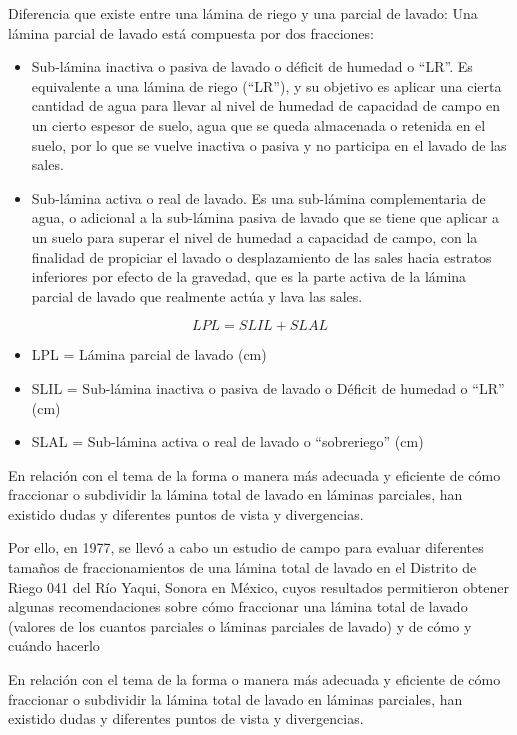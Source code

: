 Diferencia que existe entre una lámina de riego y una parcial de lavado: Una lámina parcial de lavado está compuesta por dos fracciones:
\begin{itemize}
    \item Sub-lámina inactiva o pasiva de lavado o déficit de humedad o “LR”. Es equivalente a una lámina de riego (“LR”), y su objetivo es aplicar una cierta cantidad de agua para llevar al nivel de humedad de capacidad de campo en un cierto espesor de suelo, agua que se queda almacenada o retenida en el suelo, por lo que se vuelve inactiva o pasiva y no participa en el lavado de las sales.
    \item Sub-lámina activa o real de lavado. Es una sub-lámina complementaria de agua, o adicional a la sub-lámina pasiva de lavado que se tiene que aplicar a un suelo para superar el nivel de humedad a capacidad de campo, con la finalidad de propiciar el lavado o desplazamiento de las sales hacia estratos inferiores por efecto de la gravedad, que es la parte activa de la lámina parcial de lavado que realmente actúa y lava las sales.    
\end{itemize}
\begin{equation}
    LPL = SLIL + SLAL 
\end{equation}
\begin{notation}
    \begin{itemize} En donde:
        \item LPL = Lámina parcial de lavado (cm)
        \item SLIL = Sub-lámina inactiva o pasiva de lavado o Déficit de humedad o “LR” (cm)
        \item SLAL = Sub-lámina activa o real de lavado o “sobreriego” (cm) 
    \end{itemize}
\end{notation}
En relación con el tema de la forma o manera más adecuada y eficiente de cómo fraccionar o subdividir la lámina total de lavado en láminas parciales, han existido dudas y diferentes puntos de vista y divergencias.

Por ello, en 1977, se llevó a cabo un estudio de campo para evaluar diferentes tamaños de fraccionamientos de una lámina total de lavado en el Distrito de Riego 041 del Río Yaqui, Sonora en México, cuyos resultados permitieron obtener algunas recomendaciones sobre cómo fraccionar una lámina total de lavado (valores de los cuantos parciales o láminas parciales de lavado) y de cómo y cuándo hacerlo

En relación con el tema de la forma o manera más adecuada y eficiente de cómo fraccionar o subdividir la lámina total de lavado en láminas parciales, han existido dudas y diferentes puntos de vista y divergencias.

